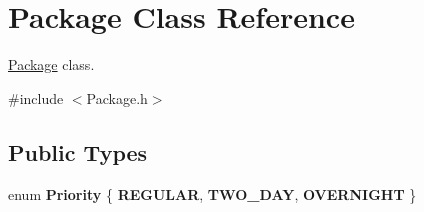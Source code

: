 \hypertarget{classPackage}{}\section{Package Class Reference}
\label{classPackage}


\hyperlink{classPackage}{Package} class.  




{\ttfamily \#include $<$Package.\+h$>$}

\subsection*{Public Types}
\begin{DoxyCompactItemize}
\item 
enum {\bfseries Priority} \{ {\bfseries R\+E\+G\+U\+L\+AR}, 
{\bfseries T\+W\+O\+\_\+\+D\+AY}, 
{\bfseries O\+V\+E\+R\+N\+I\+G\+HT}
 \}\hypertarget{classPackage_ac96ebcf78f2d93898635a1275da0c0bd}{}\label{classPackage_ac96ebcf78f2d93898635a1275da0c0bd}

\end{DoxyCompactItemize}
